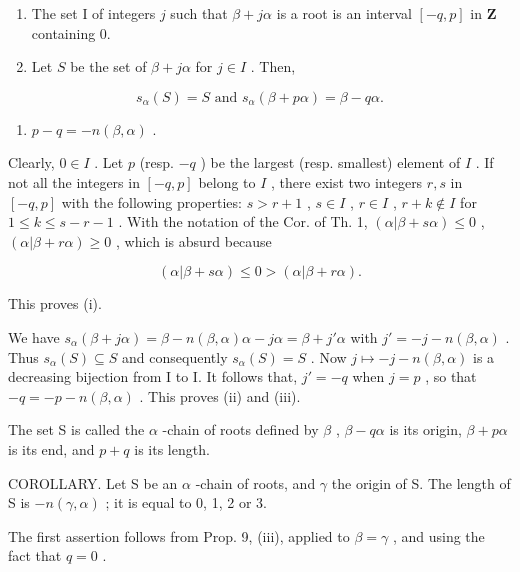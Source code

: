 \begin{enumerate}
\def\labelenumi{(\roman{enumi})}
\item
  The set I of integers \(j\) such that \(\beta + j\alpha\) is a root is an interval \([-q, p]\) in \(\mathbf{Z}\) containing 0.
\item
  Let \(S\) be the set of \(\beta + j\alpha\) for \(j \in I\) . Then,
\end{enumerate}

\[
s _ {\alpha} (S) = S \text { and } s _ {\alpha} (\beta + p \alpha) = \beta - q \alpha .
\]

\begin{enumerate}
\def\labelenumi{(\roman{enumi})}
\setcounter{enumi}{2}
\tightlist
\item
  \(p - q = -n(\beta, \alpha)\) .
\end{enumerate}

Clearly, \(0 \in I\) . Let \(p\) (resp. \(-q\) ) be the largest (resp. smallest) element of \(I\) . If not all the integers in \([-q, p]\) belong to \(I\) , there exist two integers \(r, s\) in \([-q, p]\) with the following properties: \(s > r + 1\) , \(s \in I\) , \(r \in I\) , \(r + k \notin I\) for \(1 \leqslant k \leqslant s - r - 1\) . With the notation of the Cor. of Th. 1, \((\alpha|\beta + s\alpha) \leqslant 0\) , \((\alpha|\beta + r\alpha) \geqslant 0\) , which is absurd because

\[
(\alpha | \beta + s \alpha) \leqslant 0 > (\alpha | \beta + r \alpha).
\]

This proves (i).

We have \(s_{\alpha}(\beta + j\alpha) = \beta - n(\beta, \alpha)\alpha - j\alpha = \beta + j'\alpha\) with \(j' = -j - n(\beta, \alpha)\) . Thus \(s_{\alpha}(S) \subseteq S\) and consequently \(s_{\alpha}(S) = S\) . Now \(j \mapsto -j - n(\beta, \alpha)\) is a decreasing bijection from I to I. It follows that, \(j' = -q\) when \(j = p\) , so that \(-q = -p - n(\beta, \alpha)\) . This proves (ii) and (iii).

The set S is called the \(\alpha\) -chain of roots defined by \(\beta\) , \(\beta - q\alpha\) is its origin, \(\beta + p\alpha\) is its end, and \(p + q\) is its length.

COROLLARY. Let S be an \(\alpha\) -chain of roots, and \(\gamma\) the origin of S. The length of S is \(-n(\gamma,\alpha)\) ; it is equal to 0, 1, 2 or 3.

The first assertion follows from Prop. 9, (iii), applied to \(\beta = \gamma\) , and using the fact that \(q = 0\) .

